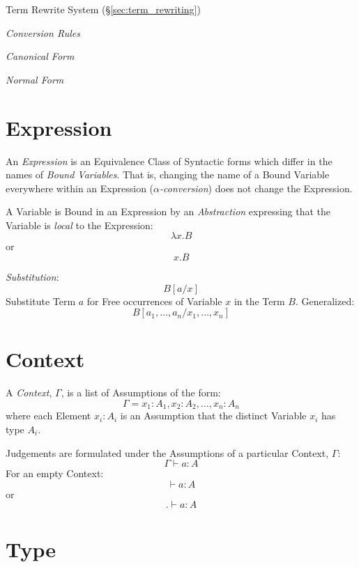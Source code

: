 Term Rewrite System (\S\ref{sec:term_rewriting})

\emph{Conversion Rules}

\emph{Canonical Form}

\emph{Normal Form}



\section{Expression}\label{sec:type_expression}

An \emph{Expression} is an Equivalence Class of Syntactic forms which
differ in the names of \emph{Bound Variables}. That is, changing the
name of a Bound Variable everywhere within an Expression
(\emph{$\alpha$-conversion}) does not change the Expression.

A Variable is Bound in an Expression by an \emph{Abstraction}
expressing that the Variable is \emph{local} to the Expression:
\[
  \lambda x.B
\]
or
\[
  x.B
\]

\emph{Substitution}:
\[
  B[a/x]
\]
Substitute Term $a$ for Free occurrences of Variable $x$ in the Term
$B$. Generalized:
\[
  B[a_1,\ldots,a_n / x_1,\ldots,x_n]
\]



\section{Context}\label{sec:type_context}

A \emph{Context}, $\Gamma$, is a list of Assumptions of the form:
\[
  \Gamma = x_1 : A_1, x_2 : A_2, \ldots, x_n : A_n
\]
where each Element $x_i : A_i$ is an Assumption that the distinct
Variable $x_i$ has type $A_i$.

Judgements are formulated under the Assumptions of a particular
Context, $\Gamma$:
\[
  \Gamma \vdash a : A
\]
For an empty Context:
\[
  \vdash a : A
\]
or
\[
  . \vdash a : A
\]



\section{Type}\label{sec:type}


